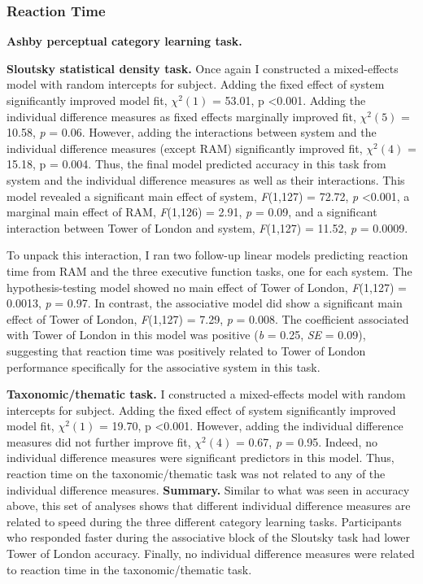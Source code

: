 \documentclass[../dissertation.tex]{subfiles}
\begin{document}
\subsubsection{Reaction Time}

\textbf{Ashby perceptual category learning task.} \par 
\textbf{Sloutsky statistical density task.}  Once again I constructed a mixed-effects model with random intercepts for subject. Adding the fixed effect of system significantly improved model fit,  $\chi^{2}(1)$ = 53.01, p \textless 0.001. Adding the individual difference measures as fixed effects marginally improved fit, $\chi^{2}(5)$  = 10.58, \textit{p} = 0.06. However, adding the interactions between system and the individual difference measures (except RAM) significantly improved fit,  $\chi^{2}(4)$ = 15.18, p = 0.004. Thus, the final model predicted accuracy in this task from system and the individual difference measures as well as their interactions. This model revealed a significant main effect of system, \textit{F}(1,127) = 72.72, \textit{p} \textless 0.001, a marginal main effect of RAM, \textit{F}(1,126) = 2.91, \textit{p} = 0.09, and a significant interaction between Tower of London and system, \textit{F}(1,127) = 11.52, \textit{p} = 0.0009. \par
	To unpack this interaction, I ran two follow-up linear models predicting reaction time from RAM and the three executive function tasks, one for each system. The hypothesis-testing model showed no main effect of Tower of London, \textit{F}(1,127) = 0.0013, \textit{p} = 0.97. In contrast, the associative model did show a significant main effect of Tower of London, \textit{F}(1,127) = 7.29, \textit{p} = 0.008. The coefficient associated with Tower of London in this model was positive (\textit{b} = 0.25, \textit{SE} = 0.09), suggesting that reaction time was positively related to Tower of London performance specifically for the associative system in this task. \par
\textbf{Taxonomic/thematic task.}  I constructed a mixed-effects model with random intercepts for subject. Adding the fixed effect of system significantly improved model fit,  $\chi^{2}(1)$ = 19.70, p \textless 0.001. However, adding the individual difference measures did not further improve fit,  $\chi^{2}(4)$ = 0.67, \textit{p} = 0.95. Indeed, no individual difference measures were significant predictors in this model. Thus, reaction time on the taxonomic/thematic task was not related to any of the individual difference measures.
\textbf{Summary.} Similar to what was seen in accuracy above, this set of analyses shows that different individual difference measures are related to speed during the three different category learning tasks. Participants who responded faster during the associative block of the Sloutsky task had lower Tower of London accuracy. Finally, no individual difference measures were related to reaction time in the taxonomic/thematic task.
\end{document}
